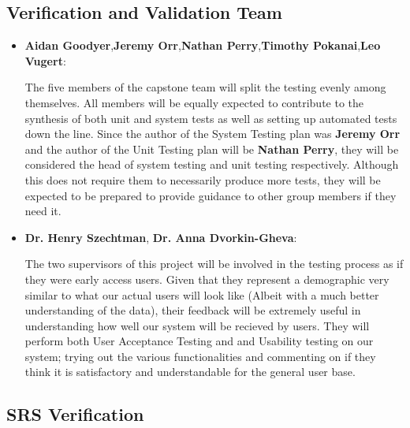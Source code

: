 \documentclass[12pt, titlepage]{article}
\begin{document}

\subsection{Verification and Validation Team}


\begin{itemize}
  \item{\textbf{Aidan Goodyer},\textbf{Jeremy Orr},\textbf{Nathan Perry},\textbf{Timothy Pokanai},\textbf{Leo Vugert}:}
   \par{The five members of the capstone team will split the testing evenly among themselves. All members will be equally expected to
  contribute to the synthesis of both unit and system tests as well as setting up automated tests down the line. Since the author of the System Testing plan was \textbf{Jeremy Orr}
  and the author of the Unit Testing plan will be \textbf{Nathan Perry}, they will be considered the head of system testing and unit testing respectively. Although
  this does not require them to necessarily produce more tests, they will be expected to be prepared to provide guidance to other group members if they need it.}
  \item{\textbf{Dr. Henry Szechtman}, \textbf{Dr. Anna Dvorkin-Gheva}:} 
  \par{ The two supervisors of this project will be involved in the testing process as if they were early
  access users. Given that they represent a demographic very similar to what our actual users will look like (Albeit with a much better understanding of the data),
  their feedback will be extremely useful in understanding how well our system will be recieved by users. They will perform both User Acceptance Testing and
  and Usability testing on our system; trying out the various functionalities and commenting on if they think it is satisfactory and understandable for the
  general user base.}

\end{itemize}

\subsection{SRS Verification}
\end{document}
